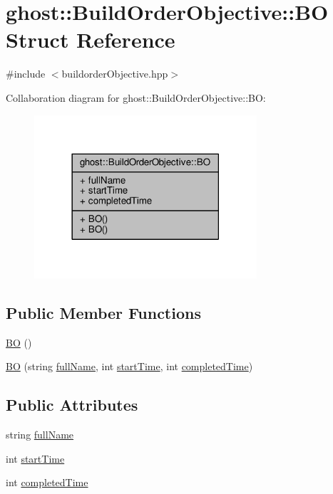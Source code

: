 \hypertarget{structghost_1_1BuildOrderObjective_1_1BO}{\section{ghost\-:\-:Build\-Order\-Objective\-:\-:B\-O Struct Reference}
\label{structghost_1_1BuildOrderObjective_1_1BO}
}


{\ttfamily \#include $<$buildorder\-Objective.\-hpp$>$}



Collaboration diagram for ghost\-:\-:Build\-Order\-Objective\-:\-:B\-O\-:
\nopagebreak
\begin{figure}[H]
\begin{center}
\leavevmode
\includegraphics[width=234pt]{structghost_1_1BuildOrderObjective_1_1BO__coll__graph}
\end{center}
\end{figure}
\subsection*{Public Member Functions}
\begin{DoxyCompactItemize}
\item 
\hyperlink{structghost_1_1BuildOrderObjective_1_1BO_ae412993ce70ea08514148f73f5e58cc4}{B\-O} ()
\item 
\hyperlink{structghost_1_1BuildOrderObjective_1_1BO_a0c74ffe417301e4014a0e39e9e45c3a9}{B\-O} (string \hyperlink{structghost_1_1BuildOrderObjective_1_1BO_ae7a6f92b372f83aca41c2e71b338a88c}{full\-Name}, int \hyperlink{structghost_1_1BuildOrderObjective_1_1BO_a2b4eac91ba456512b3b5f0f182d7dd01}{start\-Time}, int \hyperlink{structghost_1_1BuildOrderObjective_1_1BO_ac61b9122d2757d44ba08984665eda144}{completed\-Time})
\end{DoxyCompactItemize}
\subsection*{Public Attributes}
\begin{DoxyCompactItemize}
\item 
string \hyperlink{structghost_1_1BuildOrderObjective_1_1BO_ae7a6f92b372f83aca41c2e71b338a88c}{full\-Name}
\item 
int \hyperlink{structghost_1_1BuildOrderObjective_1_1BO_a2b4eac91ba456512b3b5f0f182d7dd01}{start\-Time}
\item 
int \hyperlink{structghost_1_1BuildOrderObjective_1_1BO_ac61b9122d2757d44ba08984665eda144}{completed\-Time}
\end{DoxyCompactItemize}


